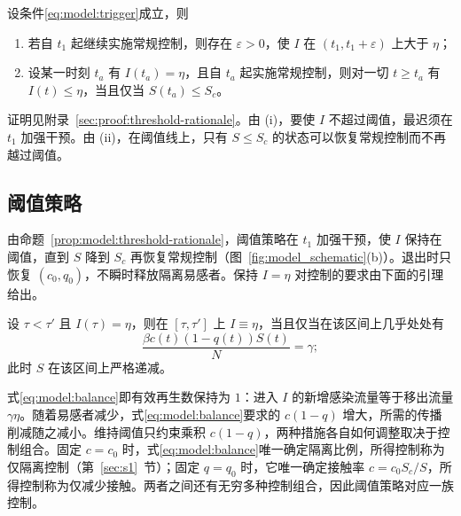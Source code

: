 \begin{proposition}
\label{prop:model:threshold-rationale}
设条件\eqref{eq:model:trigger}成立，则
\begin{enumerate}
\renewcommand{\labelenumi}{(\roman{enumi})}
\item 若自 $t_1$ 起继续实施常规控制，则存在 $\varepsilon>0$，使 $I$ 在 $(t_1,t_1+\varepsilon)$ 上大于 $\eta$；
\item 设某一时刻 $t_a$ 有 $I(t_a)=\eta$，且自 $t_a$ 起实施常规控制，则对一切 $t\ge t_a$ 有 $I(t)\le\eta$，当且仅当 $S(t_a)\le S_c$。
\end{enumerate}
\end{proposition}
证明见附录~\ref{sec:proof:threshold-rationale}。由 (i)，要使 $I$ 不超过阈值，最迟须在 $t_1$ 加强干预。由 (ii)，在阈值线上，只有 $S\le S_c$ 的状态可以恢复常规控制而不再越过阈值。

\subsection{阈值策略}
\label{sec:model:control-class}
由命题~\ref{prop:model:threshold-rationale}，阈值策略在 $t_1$ 加强干预，使 $I$ 保持在阈值，直到 $S$ 降到 $S_c$ 再恢复常规控制（图~\ref{fig:model_schematic}(b)）。退出时只恢复 $(c_0,q_0)$，不瞬时释放隔离易感者。保持 $I=\eta$ 对控制的要求由下面的引理给出。

\begin{lemma}
\label{lem:model:balance}
设 $\tau<\tau'$ 且 $I(\tau)=\eta$，则在 $[\tau,\tau']$ 上 $I\equiv\eta$，当且仅当在该区间上几乎处处有
\begin{equation}
\frac{\beta c(t)(1-q(t))S(t)}{N}=\gamma;
\label{eq:model:balance}
\end{equation}
此时 $S$ 在该区间上严格递减。
\end{lemma}

式\eqref{eq:model:balance}即有效再生数保持为 $1$：进入 $I$ 的新增感染流量等于移出流量 $\gamma\eta$。随着易感者减少，式\eqref{eq:model:balance}要求的 $c(1-q)$ 增大，所需的传播削减随之减小。维持阈值只约束乘积 $c(1-q)$，两种措施各自如何调整取决于控制组合。固定 $c=c_0$ 时，式\eqref{eq:model:balance}唯一确定隔离比例，所得控制称为仅隔离控制（第~\ref{sec:s1}~节）；固定 $q=q_0$ 时，它唯一确定接触率 $c=c_0S_c/S$，所得控制称为仅减少接触。两者之间还有无穷多种控制组合，因此阈值策略对应一族控制。

